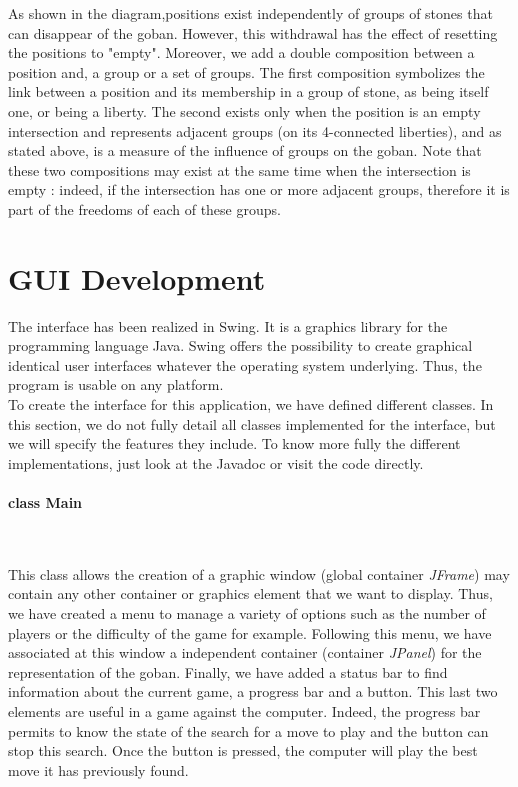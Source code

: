 \documentclass[a4paper,10pt,twoside]{report}
\begin{document}
	As shown in the diagram,positions exist independently of groups of stones that can disappear of the goban. However, this withdrawal has the effect of resetting the positions to "empty". Moreover, we add a double composition between a position and, a group or a set of groups. The first composition symbolizes the link between a position and its membership in a group of stone, as being itself one, or being a liberty. The second exists only when the position is an empty intersection and represents adjacent groups (on its 4-connected liberties), and as stated above, is a measure of the influence of groups on the goban. Note that these two compositions may exist at the same time when the intersection is empty : indeed, if the intersection has one or more adjacent groups, therefore it is part of the freedoms of each of these groups.  

	\section{GUI Development} 
	\vspace{4mm}

	The interface has been realized in Swing. It is a graphics library for the programming language Java. Swing offers the possibility to create graphical identical user interfaces whatever the operating system underlying. Thus, the program is usable on any platform.\\

	To create the interface for this application, we have defined different classes. In this section, we do not fully detail all classes implemented for the interface, but we will specify the features they include. To know more fully the different implementations, just look at the Javadoc or visit the code directly.

	\paragraph{class Main}
	~~\vspace{2mm}

	This class allows the creation of a graphic window (global container \emph{JFrame}) may contain any other container or graphics element that we want to display. Thus, we have created a menu to manage a variety of options such as the number of players or the difficulty of the game for example. Following this menu, we have associated at this window a independent container  (container \emph{JPanel}) for the representation of the goban. Finally, we have added a status bar to find information about the current game, a progress bar and a button. This last two elements are useful in a game against the computer. Indeed, the progress bar permits to know the state of the search for a move to play and the button can stop this search. Once the button is pressed, the computer will play the best move it has previously found.
\end{document}
